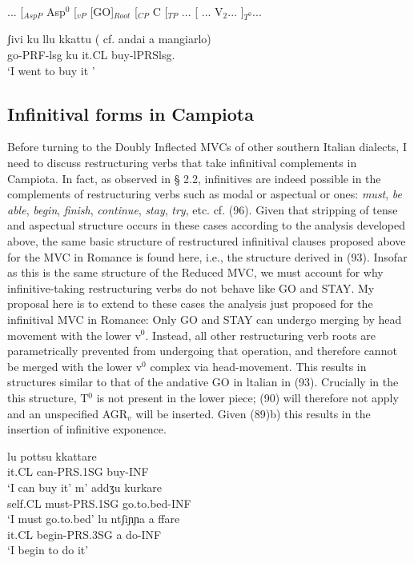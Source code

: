 \documentclass[output=paper,colorlinks,citecolor=brown,
]{langscibook}
\begin{document}
\ea
 ... [$_{AspP}$ Asp$^0$ [$_{vP}$ [GO]$_{Root}$ [$_{CP}$ C [$_{TP}$ ... [ ... V$_2$... ]$_{T^0}$...
\z

\ea \gll  ʃivi  ku  llu kkattu ( cf. andai a mangiarlo)\\
  go-PRF-lsg  ku  it.CL buy-lPRSlsg. \\
 \glt ‘I went to buy it '
\z

\subsection{Infinitival forms in Campiota}

Before turning to the Doubly Inflected MVCs of other southern Italian dialects, I need to discuss restructuring verbs that take infinitival complements in Campiota. In fact, as observed in § 2.2, infinitives are indeed possible in the complements of restructuring verbs such as modal or aspectual or ones: \textit{must},\textit{ be  able},  \textit{begin},  \textit{finish},  \textit{continue},  \textit{stay},  \textit{try}, etc. cf. (96). Given that stripping of tense and aspectual structure occurs in these cases according to the analysis developed above, the same basic structure of restructured infinitival clauses proposed above for the MVC in Romance is found here, i.e., the structure derived in (93). Insofar as this is the same structure of the Reduced MVC, we must account for why infinitive-taking restructuring verbs do not behave like GO and STAY.  My proposal here is to extend to these cases the analysis just proposed for the infinitival MVC in Romance: Only GO  and  STAY  can   undergo merging  by  head  movement  with  the  lower  v$^0$.  Instead, all other restructuring verb roots are parametrically prevented from undergoing that operation, and therefore cannot be merged with the lower v$^0$ complex via head-movement. This results in structures similar to that of the andative GO in ltalian in (93). Crucially in the this structure, T$^0$ is not present in the lower piece; (90) will therefore not apply and an unspecified  AGR$_v$ will be inserted.  Given (89)b) this results in the insertion of infinitive exponence.

\ea
    \ea \gll lu      pottsu     kkattare\\
    it.CL can-PRS.1SG buy-INF\\
    \glt `I can buy it'
    \ex \gll m’    addʒu      kurkare\\
    self.CL  must-PRS.1SG   go.to.bed-INF \\
    \glt `I must go.to.bed'
    \ex \gll lu ntʃiɲɲa       a  ffare\\
    it.CL begin-PRS.3SG a  do-INF \\
    \glt `I begin to do it'
    \z
\z
\end{document}

